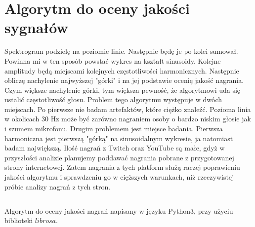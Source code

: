 \documentclass[a4paper,12pt]{extarticle}
\begin{document}
\section*{Algorytm do oceny jakości sygnałów}

Spektrogram podzielę na poziomie linie. Następnie będę je po kolei sumował. Powinna mi w ten sposób powstać wykres na kształt sinusoidy. Kolejne amplitudy będą miejscami kolejnych częstotliwości harmonicznych. Następnie obliczę nachylenie najwyższej "górki" i na jej podstawie ocenię jakość nagrania. Czym większe nachylenie górki, tym większa pewność, że algorytmowi uda się ustalić częstotliwość głosu. Problem tego algorytmu występuje w dwóch miejscach. Po pierwsze nie badam artefaktów, które ciężko znaleźć. Pozioma linia w okolicach 30 Hz może być zarówno nagraniem osoby o bardzo niskim głosie jak i szumem mikrofonu. Drugim problemem jest miejsce badania. Pierwsza harmoniczna jest pierwszą "górką" na sinusoidalnym wykresie, ja natomiast badam największą. Ilość nagrań z Twitch oraz YouTube są małe, gdyż w przyszłości analizie planujemy poddawać nagrania pobrane z przygotowanej strony internetowej. Zatem nagrania z tych platform służą raczej poprawieniu jakości algorytmu i sprawdzeniu go w cięższych warunkach, niż rzeczywistej próbie analizy nagrań z tych stron.

\newpage

\subsection*{}
Algorytm do oceny jakości nagrań napisany w języku Python3, przy użyciu biblioteki $librosa$.
\end{document}
